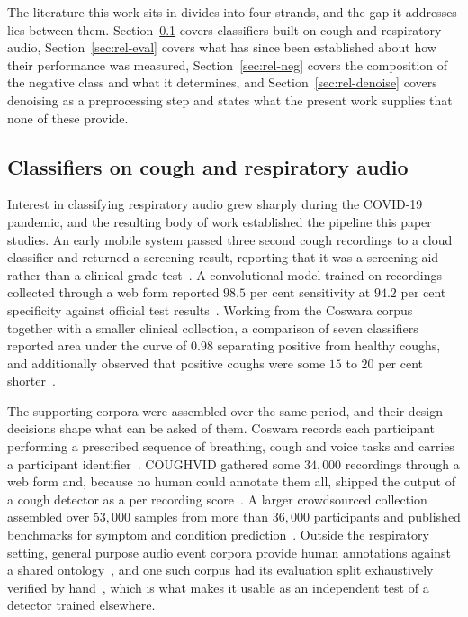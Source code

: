 \documentclass{ieeeaccess}
\begin{document}
The literature this work sits in divides into four strands, and the gap it addresses lies
between them. Section~\ref{sec:rel-class} covers classifiers built on cough and
respiratory audio, Section~\ref{sec:rel-eval} covers what has since been established
about how their performance was measured, Section~\ref{sec:rel-neg} covers the
composition of the negative class and what it determines, and
Section~\ref{sec:rel-denoise} covers denoising as a preprocessing step and states what
the present work supplies that none of these provide.

\subsection{Classifiers on cough and respiratory audio}\label{sec:rel-class}

Interest in classifying respiratory audio grew sharply during the COVID-19 pandemic, and
the resulting body of work established the pipeline this paper studies. An early mobile
system passed three second cough recordings to a cloud classifier and returned a
screening result, reporting that it was a screening aid rather than a clinical grade
test~\cite{imran2020}. A convolutional model trained on recordings collected through a web
form reported $98.5$ per cent sensitivity at $94.2$ per cent specificity against official
test results~\cite{laguarta2020}. Working from the Coswara corpus together with a smaller
clinical collection, a comparison of seven classifiers reported area under the curve of
$0.98$ separating positive from healthy coughs, and additionally observed that positive
coughs were some $15$ to $20$ per cent shorter~\cite{pahar2021}.

The supporting corpora were assembled over the same period, and their design decisions
shape what can be asked of them. Coswara records each participant performing a prescribed
sequence of breathing, cough and voice tasks and carries a participant
identifier~\cite{coswara2020}. COUGHVID gathered some $34{,}000$ recordings through a web
form and, because no human could annotate them all, shipped the output of a cough
detector as a per recording score~\cite{coughvid2021}. A larger crowdsourced collection
assembled over $53{,}000$ samples from more than $36{,}000$ participants and published
benchmarks for symptom and condition prediction~\cite{xia2021}. Outside the respiratory
setting, general purpose audio event corpora provide human annotations against a shared
ontology~\cite{gemmeke2017}, and one such corpus had its evaluation split exhaustively
verified by hand~\cite{fsd50k2022}, which is what makes it usable as an independent test
of a detector trained elsewhere.
\end{document}
